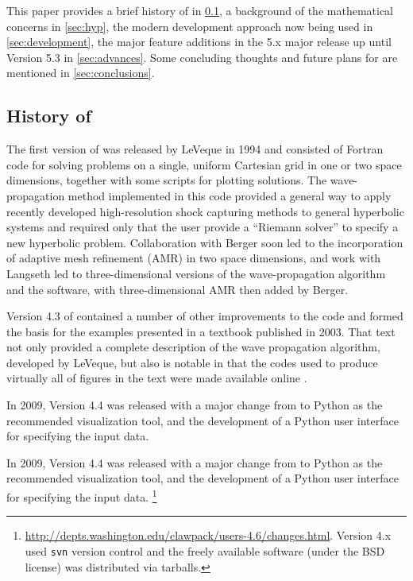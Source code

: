 This paper provides a brief history of \clawpack in
\cref{sub:history}, a background of the mathematical concerns in \cref{sec:hyp},
the modern development approach now being used in \cref{sec:development},
the major feature additions in the \clawpack 5.x major release up until Version 5.3 in
\cref{sec:advances}. Some concluding thoughts and future plans for
\clawpack are mentioned in
\cref{sec:conclusions}.

\subsection{History of \clawpack} \label{sub:history}

The first version of \clawpack was released by LeVeque in 1994
\cite{clawpack-v1} and consisted of Fortran code for solving problems on a
single, uniform Cartesian
grid in one or two space dimensions, together with some \mlab
\cite{MATLAB:2015a} scripts
for plotting solutions. The wave-propagation method implemented
in this code provided a general way to apply recently developed
high-resolution shock capturing methods to general hyperbolic systems and
required only that the user provide a ``Riemann solver'' to specify a new
hyperbolic problem.
Collaboration with Berger \cite{mjb-rjl:amrclaw}
soon led to the incorporation of adaptive mesh refinement (AMR) in two space
dimensions, and work with Langseth \cite{jol-rjl:3d, jol:thesis}
led to three-dimensional versions of the wave-propagation algorithm and the
software, with three-dimensional AMR then added by Berger.

Version 4.3 of \clawpack contained a number of other improvements to
the code and formed the basis for the examples presented in a textbook
\cite{rjl:fvmhp} published in 2003.  That text not only provided a
complete description of the wave propagation algorithm, developed by LeVeque,
but also is notable in that the codes used to produce virtually all of figures
in the text were made available online \cite{rjl:fvmhp}.

In 2009, \clawpack Version 4.4 was released with a major change from \mlab
to Python as the recommended visualization tool, and the development
of a Python user interface for specifying the input data.

In 2009, \clawpack Version 4.4 was released with a major change from \mlab to
Python as the recommended visualization tool, and the development of a Python
user interface for specifying the input data. \footnote{\url{http://depts.washington.edu/clawpack/users-4.6/changes.html}.  Version 4.x
used \texttt{svn} version control and the freely available software (under the
BSD license) was distributed via tarballs.}

